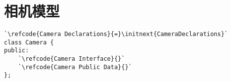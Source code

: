 \section{相机模型}\label{sec:相机模型}

\label{code:overview_Camera}
\begin{lstlisting}
`\refcode{Camera Declarations}{=}\initnext{CameraDeclarations}`
class Camera {
public:
    `\refcode{Camera Interface}{}`
    `\refcode{Camera Public Data}{}`
};
\end{lstlisting}